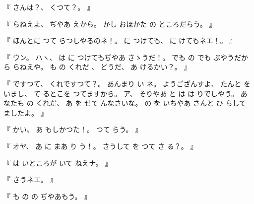 %
『
さんは？、
%
くつて？。
』

%
『
らねえよ、
%
ぢやあ
えから。
%
かし
おほかた
の
ところだらう。
』

%
『
ほんとに
つて
らつしやるのネ！。
%
に
つけても、
%
に
けてもネエ！。
』

%
『
ウン。
%
ハヽ、
%
は
に
つけてもぢやあ
さゝうだ！。
%
でも
の
でも
ぶやうだから
らねえや。
%
も
の
くれだ
、
%
%
どうだ、
%
あ
けるかい？。
』

%
『
ですつて、
%
くれですつて？。
%
あんまり
い
ネ。
%
ようござんすよ、
%
たんと
を
いまし、
%
て
るとこを
つてますから。
%
ア、
%
そりやあ
と
は
は
りでしやう。
%
あなたも
の
くれだ、
%
あ
を
せて
んなさいな。
%
の
を
いちやあ
さんと
ひ
らして
ましたよ。
』

%
『
かい、
%
あ
もしかつた！。
%
つて
らう。
』

%
『
オヤ、
%
あ
に
まあ
り
う！。
%
さうして
を
つて
さ
る？。
』

%
『
は%
いところが
いて
ねえナ。
』

%
『
さうネエ。
』

%
『
も
の
の
ぢやあもう。
』

